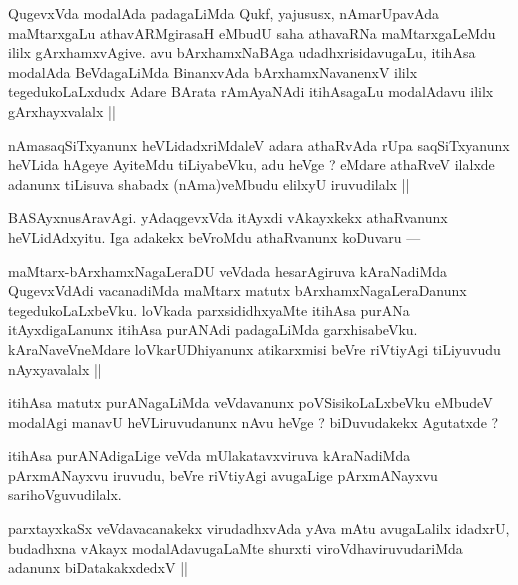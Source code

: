 
\begin{artha}
QugevxVda modalAda padagaLiMda Qukf, yajususx, nAmarUpavAda maMtarxgaLu athavARMgirasaH eMbudU saha athavaRNa maMtarxgaLeMdu ililx gArxhamxvAgive. avu bArxhamxNaBAga udadhxrisidavugaLu, itihAsa modalAda BeVdagaLiMda BinanxvAda bArxhamxNavanenxV ililx tegedukoLaLxdudx Adare BArata rAmAyaNAdi itihAsagaLu modalAdavu ililx gArxhayxvalalx ||
\end{artha}


\begin{artha}
nAmasaqSiTxyanunx heVLidadxriMdaleV adara athaRvAda rUpa saqSiTxyanunx heVLida hAgeye AyiteMdu tiLiyabeVku, adu heVge ? eMdare athaRveV ilalxde adanunx tiLisuva shabadx (nAma)veMbudu elilxyU iruvudilalx ||
\end{artha}

\begin{artha}
BASAyxnusAravAgi. yAdaqgevxVda itAyxdi vAkayxkekx athaRvanunx heVLidAdxyitu. Iga adakekx beVroMdu athaRvanunx koDuvaru ---
\end{artha}

\begin{artha}
maMtarx-bArxhamxNagaLeraDU veVdada hesarAgiruva kAraNadiMda QugevxVdAdi vacanadiMda maMtarx matutx bArxhamxNagaLeraDanunx tegedukoLaLxbeVku. loVkada parxsididhxyaMte itihAsa purANa itAyxdigaLanunx itihAsa purANAdi padagaLiMda garxhisabeVku. kAraNaveVneMdare loVkarUDhiyanunx atikarxmisi beVre riVtiyAgi tiLiyuvudu nAyxyavalalx ||
\end{artha}


\begin{artha}
itihAsa matutx purANagaLiMda veVdavanunx poVSisikoLaLxbeVku eMbudeV modalAgi manavU heVLiruvudanunx nAvu heVge ? biDuvudakekx Agutatxde ?
\end{artha}

\begin{artha}
itihAsa purANAdigaLige veVda mUlakatavxviruva kAraNadiMda pArxmANayxvu iruvudu, beVre riVtiyAgi avugaLige pArxmANayxvu sarihoVguvudilalx.
\end{artha}

\begin{artha}
parxtayxkaSx veVdavacanakekx virudadhxvAda yAva mAtu avugaLalilx idadxrU, budadhxna vAkayx modalAdavugaLaMte shurxti viroVdhaviruvudariMda adanunx biDatakakxdedxV ||
\end{artha}

